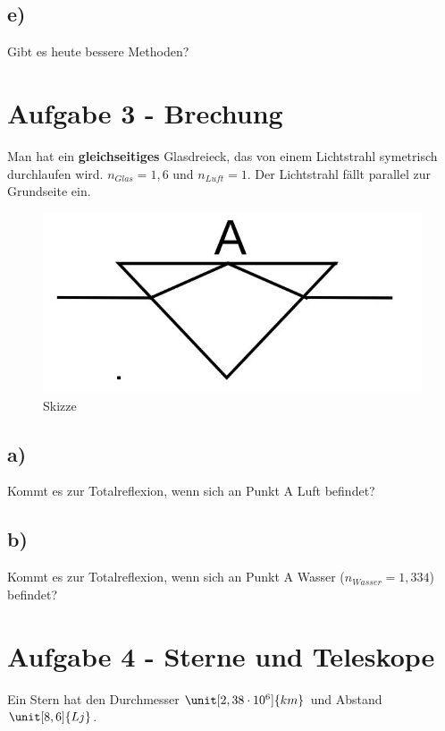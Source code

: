 \subsection*{e)}

Gibt es heute bessere Methoden?


\section{Aufgabe 3 - Brechung}

Man hat ein \textbf{gleichseitiges} Glasdreieck, das von einem Lichtstrahl symetrisch durchlaufen wird. $n_{Glas} = 1,6$ und $n_{Luft} = 1$. Der Lichtstrahl fällt parallel zur Grundseite ein.


\begin{figure}[h]
	\centering
	\includegraphics[scale=0.5]{A3_1.jpg}
	\caption{Skizze}
\end{figure}

\subsection*{a)}

Kommt es zur Totalreflexion, wenn sich an Punkt A Luft befindet?

\subsection*{b)}

Kommt es zur Totalreflexion, wenn sich an Punkt A Wasser ($n_{Wasser} = 1,334$) befindet?

\newpage

\section{Aufgabe 4 - Sterne und Teleskope}


Ein Stern hat den Durchmesser $\unit[2,38 \cdot 10^6]{km}$ und Abstand $\unit[8,6]{Lj}$.


